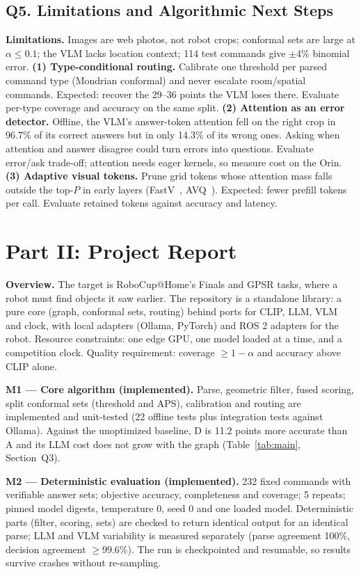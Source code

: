 \documentclass[conference]{IEEEtran}
\begin{document}
\subsection{Q5. Limitations and Algorithmic Next Steps}
\textbf{Limitations.} Images are web photos, not robot crops; conformal sets are large at $\alpha\le0.1$;
the VLM lacks location context; 114 test commands give $\pm$4\% binomial error.
\textbf{(1) Type-conditional routing.} Calibrate one threshold per parsed command type (Mondrian conformal) and
never escalate room/spatial commands. Expected: recover the 29--36 points the VLM loses there. Evaluate per-type
coverage and accuracy on the same split.
\textbf{(2) Attention as an error detector.} Offline, the VLM's answer-token attention fell on the right crop in
96.7\% of its correct answers but in only 14.3\% of its wrong ones. Asking when attention and answer disagree
could turn errors into questions. Evaluate error/ask trade-off; attention needs eager kernels, so measure cost on the Orin.
\textbf{(3) Adaptive visual tokens.} Prune grid tokens whose attention mass falls outside the top-$P$ in early
layers (FastV~\cite{chen2024fastv}, AVQ~\cite{vandendool2026avq}). Expected: fewer prefill tokens per call.
Evaluate retained tokens against accuracy and latency.

\section{Part II: Project Report}

\textbf{Overview.} The target is RoboCup@Home's Finals and GPSR tasks, where a robot must find objects it saw
earlier. The repository is a standalone library: a pure core (graph, conformal sets, routing) behind ports for CLIP,
LLM, VLM and clock, with local adapters (Ollama, PyTorch) and ROS 2 adapters for the robot. Resource constraints:
one edge GPU, one model loaded at a time, and a competition clock. Quality requirement: coverage $\ge1-\alpha$ and
accuracy above CLIP alone.

\textbf{M1 --- Core algorithm (implemented).} Parse, geometric filter, fused scoring, split conformal sets
(threshold and APS), calibration and routing are implemented and unit-tested (22 offline tests plus integration
tests against Ollama). Against the unoptimized baseline, D is 11.2 points more accurate than A and its LLM cost
does not grow with the graph (Table~\ref{tab:main}, Section~Q3).

\textbf{M2 --- Deterministic evaluation (implemented).} 232 fixed commands with verifiable answer sets; objective
accuracy, completeness and coverage; 5 repeats; pinned model digests, temperature 0, seed 0 and one loaded model.
Deterministic parts (filter, scoring, sets) are checked to return identical output for an identical parse; LLM and VLM
variability is measured separately (parse agreement 100\%, decision agreement $\ge$99.6\%). The run is checkpointed
and resumable, so results survive crashes without re-sampling.
\end{document}
